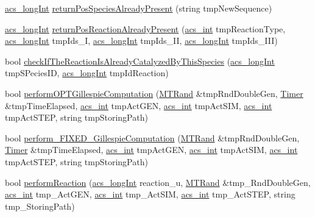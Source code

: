 \begin{DoxyCompactItemize}
\item 
\hyperlink{a00050_a19319d75f02db4308bc5c0026d98cd85}{acs\+\_\+long\+Int} \hyperlink{a00013_a4e26cc574e20a5afcfbbe5887109c5af}{return\+Pos\+Species\+Already\+Present} (string tmp\+New\+Sequence)
\item 
\hyperlink{a00050_a19319d75f02db4308bc5c0026d98cd85}{acs\+\_\+long\+Int} \hyperlink{a00013_a6feec5685b519ba0cdae0e5c59dffff0}{return\+Pos\+Reaction\+Already\+Present} (\hyperlink{a00050_a8d277355641a098190360234e2ebde35}{acs\+\_\+int} tmp\+Reaction\+Type, \hyperlink{a00050_a19319d75f02db4308bc5c0026d98cd85}{acs\+\_\+long\+Int} tmp\+Ids\+\_\+\+I, \hyperlink{a00050_a19319d75f02db4308bc5c0026d98cd85}{acs\+\_\+long\+Int} tmp\+Ids\+\_\+\+I\+I, \hyperlink{a00050_a19319d75f02db4308bc5c0026d98cd85}{acs\+\_\+long\+Int} tmp\+Ids\+\_\+\+I\+I\+I)
\item 
bool \hyperlink{a00013_ac4c90b07b8e75ea03e2ced0ea644a69f}{check\+If\+The\+Reaction\+Is\+Already\+Catalyzed\+By\+This\+Species} (\hyperlink{a00050_a19319d75f02db4308bc5c0026d98cd85}{acs\+\_\+long\+Int} tmp\+S\+Pecies\+I\+D, \hyperlink{a00050_a19319d75f02db4308bc5c0026d98cd85}{acs\+\_\+long\+Int} tmp\+Id\+Reaction)
\item 
bool \hyperlink{a00013_ad4dcf928538066ff8a501dc7f72ac750}{perform\+O\+P\+T\+Gillespie\+Computation} (\hyperlink{a00015}{M\+T\+Rand} \&tmp\+Rnd\+Double\+Gen, \hyperlink{a00022}{Timer} \&tmp\+Time\+Elapsed, \hyperlink{a00050_a8d277355641a098190360234e2ebde35}{acs\+\_\+int} tmp\+Act\+G\+E\+N, \hyperlink{a00050_a8d277355641a098190360234e2ebde35}{acs\+\_\+int} tmp\+Act\+S\+I\+M, \hyperlink{a00050_a8d277355641a098190360234e2ebde35}{acs\+\_\+int} tmp\+Act\+S\+T\+E\+P, string tmp\+Storing\+Path)
\item 
bool \hyperlink{a00013_a847f333ec6acea11f2d0fc99bab52586}{perform\+\_\+\+F\+I\+X\+E\+D\+\_\+\+Gillespie\+Computation} (\hyperlink{a00015}{M\+T\+Rand} \&tmp\+Rnd\+Double\+Gen, \hyperlink{a00022}{Timer} \&tmp\+Time\+Elapsed, \hyperlink{a00050_a8d277355641a098190360234e2ebde35}{acs\+\_\+int} tmp\+Act\+G\+E\+N, \hyperlink{a00050_a8d277355641a098190360234e2ebde35}{acs\+\_\+int} tmp\+Act\+S\+I\+M, \hyperlink{a00050_a8d277355641a098190360234e2ebde35}{acs\+\_\+int} tmp\+Act\+S\+T\+E\+P, string tmp\+Storing\+Path)
\item 
bool \hyperlink{a00013_a1db4e67ba458a54f4fab3e10a203765c}{perform\+Reaction} (\hyperlink{a00050_a19319d75f02db4308bc5c0026d98cd85}{acs\+\_\+long\+Int} reaction\+\_\+u, \hyperlink{a00015}{M\+T\+Rand} \&tmp\+\_\+\+Rnd\+Double\+Gen, \hyperlink{a00050_a8d277355641a098190360234e2ebde35}{acs\+\_\+int} tmp\+\_\+\+Act\+G\+E\+N, \hyperlink{a00050_a8d277355641a098190360234e2ebde35}{acs\+\_\+int} tmp\+\_\+\+Act\+S\+I\+M, \hyperlink{a00050_a8d277355641a098190360234e2ebde35}{acs\+\_\+int} tmp\+\_\+\+Act\+S\+T\+E\+P, string tmp\+\_\+\+Storing\+Path)

\end{DoxyCompactItemize}
